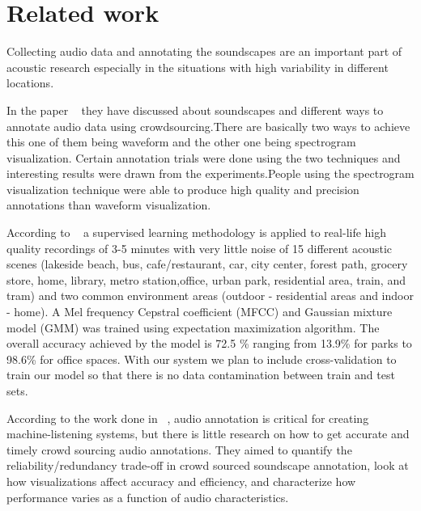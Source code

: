 
\section{Related work}
Collecting audio data and annotating the soundscapes are an important part of acoustic research especially in the situations with high variability in different locations.

In the paper ~\cite{5} they have discussed about soundscapes and different ways to annotate audio data using crowdsourcing.There are basically two ways to achieve this one of them being waveform and the other one being spectrogram visualization. Certain annotation trials were done using the two techniques and interesting results were drawn from the experiments.People using the spectrogram visualization technique were able to produce high quality and precision annotations than waveform visualization.

According to ~\cite{6} a supervised learning methodology is applied to real-life high quality recordings of 3-5 minutes with very little noise of 15 different acoustic scenes (lakeside beach, bus, cafe/restaurant, car, city center, forest path, grocery store, home, library, metro station,office, urban park, residential area, train, and tram) and two common environment areas (outdoor - residential areas and indoor - home). A Mel frequency Cepstral coefficient (MFCC) and Gaussian mixture model (GMM) was trained using expectation maximization algorithm. The overall accuracy achieved by the model is 72.5 \% ranging from 13.9\% for parks to 98.6\% for office spaces. With our system we plan to include cross-validation to train our model so that there is no data contamination between train and test sets.

According to the work done in ~\cite{4}, audio annotation is critical for creating machine-listening systems, but there is little research on how to get accurate and timely crowd sourcing audio annotations. They aimed to quantify the reliability/redundancy trade-off in crowd sourced soundscape annotation, look at how visualizations affect accuracy and efficiency, and characterize how performance varies as a function of audio characteristics.   

